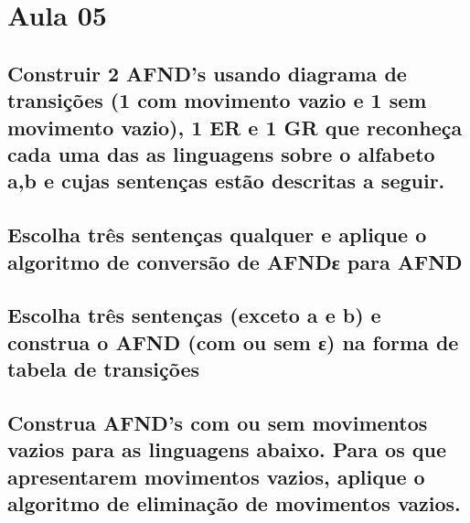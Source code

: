 \section{Aula 05}
    \subsection{Construir 2 AFND's usando diagrama de transições (1 com movimento vazio e 1 sem movimento vazio), 1 ER e 1 GR que reconheça cada uma das as linguagens sobre o alfabeto {a,b} e cujas sentenças estão descritas a seguir.}

    \subsection{Escolha três sentenças qualquer e aplique o algoritmo de conversão de AFNDε para AFND}
    
    \subsection{Escolha três sentenças (exceto a e b) e construa o AFND (com ou sem ε) na forma de tabela de transições}

    \subsection{Construa AFND's com ou sem movimentos vazios para as linguagens abaixo. Para os que apresentarem movimentos vazios, aplique o algoritmo de eliminação de movimentos vazios.}
